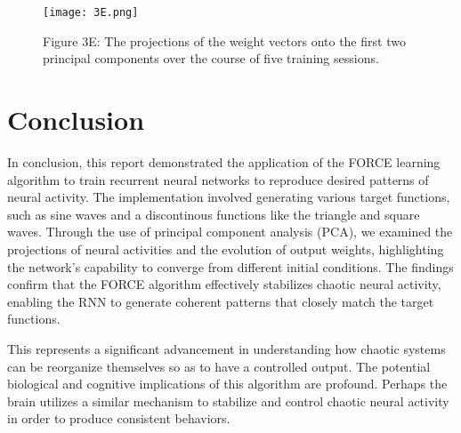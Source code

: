 \documentclass{article}
\begin{document}
\begin{figure}[ht]
    \centering
    \texttt{[image: 3E.png]}
    \captionsetup{font=normalsize, width=1\textwidth, labelformat=empty}
    \caption{Figure 3E: The projections of the weight vectors onto the first two principal components over the course of five training sessions.}
\end{figure}


\section*{Conclusion}
\vspace{.2em}

In conclusion, this report demonstrated the application of the FORCE learning algorithm to train recurrent neural networks to reproduce desired patterns of neural activity. The implementation involved generating various target functions, such as sine waves and a discontinous functions like the triangle and square waves. Through the use of principal component analysis (PCA), we examined the projections of neural activities and the evolution of output weights, highlighting the network’s capability to converge from different initial conditions. The findings confirm that the FORCE algorithm effectively stabilizes chaotic neural activity, enabling the RNN to generate coherent patterns that closely match the target functions. 
\vspace{.5em}

This represents a significant advancement in understanding how chaotic systems can be reorganize themselves so as to have a controlled output. The potential biological and cognitive implications of this algorithm are profound. Perhaps the brain utilizes a similar mechanism to stabilize and control chaotic neural activity in order to produce consistent behaviors. 

\end{document}
